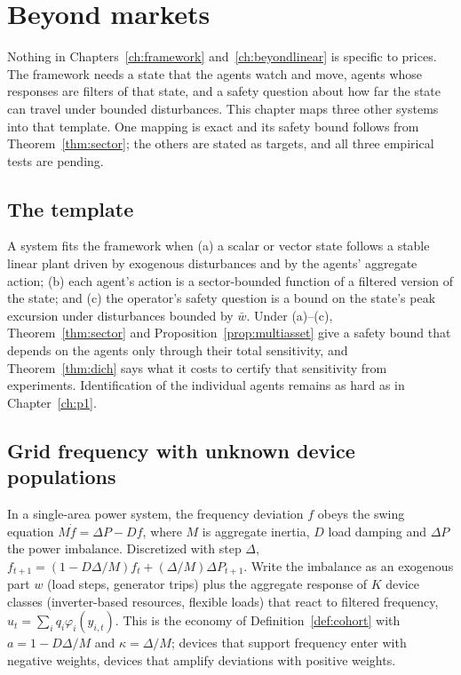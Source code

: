 \chapter{Beyond markets}\label{ch:beyondmarkets}

Nothing in Chapters~\ref{ch:framework} and~\ref{ch:beyondlinear} is specific to prices. The framework needs a state that the agents watch and move, agents whose responses are filters of that state, and a safety question about how far the state can travel under bounded disturbances. This chapter maps three other systems into that template. One mapping is exact and its safety bound follows from Theorem~\ref{thm:sector}; the others are stated as targets, and all three empirical tests are pending.

\section{The template}\label{sec:bm_template}

A system fits the framework when (a) a scalar or vector state follows a stable linear plant driven by exogenous disturbances and by the agents' aggregate action; (b) each agent's action is a sector-bounded function of a filtered version of the state; and (c) the operator's safety question is a bound on the state's peak excursion under disturbances bounded by $\bar w$. Under (a)--(c), Theorem~\ref{thm:sector} and Proposition~\ref{prop:multiasset} give a safety bound that depends on the agents only through their total sensitivity, and Theorem~\ref{thm:dich} says what it costs to certify that sensitivity from experiments. Identification of the individual agents remains as hard as in Chapter~\ref{ch:p1}.

\section{Grid frequency with unknown device populations}\label{sec:bm_grid}

In a single-area power system, the frequency deviation $f$ obeys the swing equation $M\dot f=\Delta P-Df$, where $M$ is aggregate inertia, $D$ load damping and $\Delta P$ the power imbalance. Discretized with step $\Delta$, $f_{t+1}=(1-D\Delta/M)f_t+(\Delta/M)\Delta P_{t+1}$. Write the imbalance as an exogenous part $w$ (load steps, generator trips) plus the aggregate response of $K$ device classes (inverter-based resources, flexible loads) that react to filtered frequency, $u_t=\sum_iq_i\varphi_i(y_{i,t})$. This is the economy of Definition~\ref{def:cohort} with $a=1-D\Delta/M$ and $\kappa=\Delta/M$; devices that support frequency enter with negative weights, devices that amplify deviations with positive weights.

